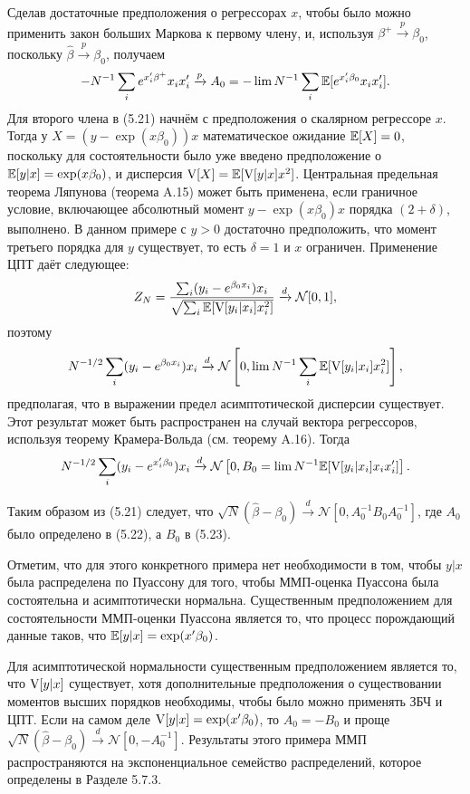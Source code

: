 Сделав достаточные предположения о регрессорах $x$, чтобы было можно применить закон больших Маркова к первому члену, и, используя $\beta^+ \xrightarrow{p} \beta_0$, поскольку $\hat{\beta} \xrightarrow{p} \beta_0$, получаем
\begin{equation}
-N^{-1} \sum_i e^{x'_i \beta^+} x_i x'_i \xrightarrow{p} A_0 = -\lim N^{-1} \sum_i \mathbb{E}[e^{x'_i \beta_0} x_i x'_i].
\end{equation}
Для второго члена в (5.21) начнём с предположения о скалярном регрессоре $x$. Тогда у $X=(y-\exp(x \beta_0))x$ математическое ожидание $\mathbb{E}[X]=0$, поскольку для состоятельности было уже введено предположение о $\mathbb{E}[y|x]=\exp(x \beta_0)$, и дисперсия $\mathrm{V}[X]=\mathbb{E}[\mathrm{V}[y|x]x^2]$. Центральная предельная теорема Ляпунова (теорема A.15) может быть применена, если граничное условие, включающее абсолютный момент $y-\exp(x \beta_0)x$ порядка $(2+\delta)$, выполнено. В данном примере с $y>0$ достаточно предположить, что момент третьего порядка для $y$ существует, то есть $\delta=1$ и $x$ ограничен. Применение ЦПТ даёт следующее:
\[
Z_N=\frac{\sum_i (y_i-e^{\beta_0 x_i})x_i}{\sqrt{\sum_i \mathbb{E}[\mathrm{V}[y_i|x_i]x_i^2]}} \xrightarrow{d} \mathcal{N}[0,1],
\]
поэтому 
\[
N^{-1/2} \sum_i (y_i-e^{\beta_0 x_i})x_i \xrightarrow{d} \mathcal{N}\left[0,\lim N^{-1}\sum_i \mathbb{E}[\mathrm{V}[y_i|x_i]x_i^2]\right],
\]
предполагая, что в выражении предел асимптотической дисперсии существует. Этот результат может быть распространен на случай вектора регрессоров, используя теорему Крамера-Вольда (см. теорему A.16). Тогда
\begin{equation}
N^{-1/2} \sum_i (y_i-e^{x'_i \beta_0})x_i \xrightarrow{d} \mathcal{N} \left[0,B_0= \lim N^{-1} \mathbb{E}[\mathrm{V}[y_i|x_i]x_i x'_i]\right].
\end{equation}

Таким образом из (5.21) следует, что $\sqrt{N}(\hat{\beta}-\beta_0) \xrightarrow{d} \mathcal{N}[0,A_0^{-1}B _0 A_0^{-1}]$, где $A_0$ было определено в (5.22), а $B_0$ в (5.23).

Отметим, что для этого конкретного примера нет необходимости в том, чтобы $y|x$ была распределена по Пуассону для того, чтобы ММП-оценка Пуассона была состоятельна и асимптотически нормальна. Существенным предположением для состоятельности ММП-оценки Пуассона является то, что процесс порождающий данные таков, что $\mathbb{E}[y|x]=\exp(x' \beta_0)$.

Для асимптотической нормальности существенным предположением является то, что $\mathrm{V}[y|x]$ существует, хотя дополнительные предположения о существовании моментов высших порядков необходимы, чтобы было можно применять ЗБЧ и ЦПТ. Если на самом деле $\mathrm{V}[y|x]=\exp(x' \beta_0)$, то $A_0=-B_0$ и проще $\sqrt{N}(\hat{\beta}-\beta_0) \xrightarrow{d} \mathcal{N}[0,-A_0^{-1}]$. Результаты этого примера ММП распространяются на экспоненциальное семейство распределений, которое определены в Разделе 5.7.3.

